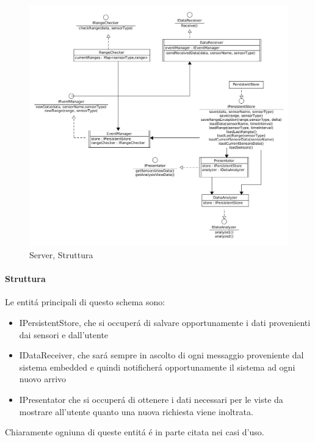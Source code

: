 \begin{figure}[pH]
\centering
\includegraphics[width=\textwidth,height=\textheight,keepaspectratio]{Figures/DomainModel/Server/Structure.jpg}
\caption{Server, Struttura}
\end{figure}

\afterpage{\clearpage}

\newpage

\paragraph{Struttura}

Le entit\'a principali di questo schema sono:
\begin{itemize}
  \item IPersistentStore, che si occuper\'a di salvare opportunamente i dati provenienti dai sensori e dall'utente
  \item IDataReceiver, che sar\'a sempre in ascolto di ogni messaggio proveniente dal sistema embedded e quindi notificher\'a opportunamente il sistema ad ogni nuovo arrivo
  \item IPresentator che si occuper\'a di ottenere i dati necessari per le viste da mostrare all'utente quanto una nuova richiesta viene inoltrata.
\end{itemize}

Chiaramente ogniuna di queste entit\'a \'e in parte citata nei casi d'uso.

